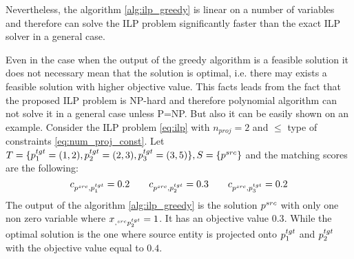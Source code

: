 Nevertheless, the algorithm \ref{alg:ilp_greedy} is linear on a number of variables and therefore can
solve the ILP problem significantly faster than the exact ILP solver in a general case.

Even in the case when the output of the greedy algorithm is a feasible solution it does not
necessary mean that the solution is optimal, i.e. there may exists a feasible solution with higher objective
value. This facts leads from the fact that the proposed ILP problem is NP-hard and therefore polynomial
algorithm can not solve it in a general case unless P=NP. But also it can be easily shown on an example.
Consider the ILP problem \eqref{eq:ilp} with \( n_{proj} = 2 \) and \( \leq \) type of constraints \eqref{eq:num_proj_const}.
Let \( T = \{ p_1^{tgt} = (1, 2), p_2^{tgt} = (2, 3), p_3^{tgt} = (3, 5) \}, S = \{ p^{src} \} \) and
the matching scores are the following:
\[
    c_{p^{src}, p_1^{tgt}} = 0.2 \qquad
    c_{p^{src}, p_2^{tgt}} = 0.3 \qquad
    c_{p^{src}, p_3^{tgt}} = 0.2
\]
The output of the algorithm \ref{alg:ilp_greedy} is the solution \( p^{src} \) with only one
non zero variable where \( x_{,^{src} p_2^{tgt}} = 1 \). It has an objective value \( 0.3 \).
While the optimal solution is the one where source entity is projected onto \( p_1^{tgt} \) and
\( p_2^{tgt} \) with the objective value equal to \( 0.4 \).
